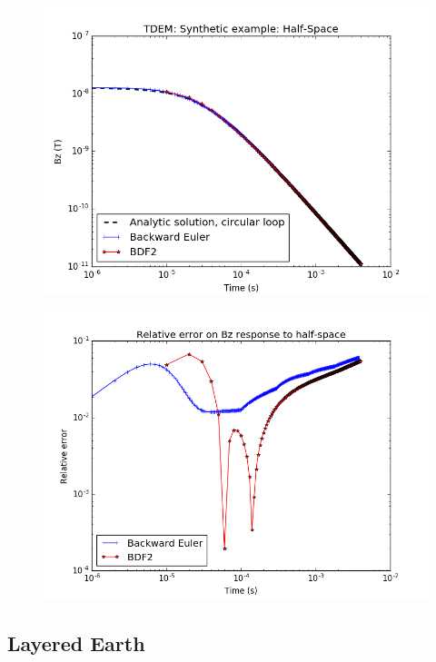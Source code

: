 \documentclass[twoside]{article}
\begin{document}
\begin{figure}[!ht]
\centering
\begin{minipage}{0.5\textwidth}
  \centering
  \includegraphics[width=.9\linewidth]{./figures/Examples/HalfSpace.png}
  \label{HS}
\end{minipage}%
\begin{minipage}{.5\textwidth}
  \centering
  \includegraphics[width=.9\linewidth]{./figures/Examples/HS_relative_error.png}
  \label{HS_eps}
\end{minipage}
\end{figure}

\subsection{Layered Earth}
\end{document}
